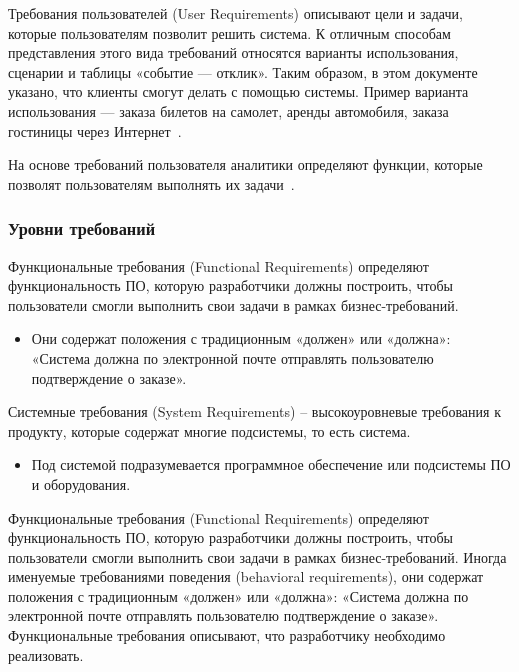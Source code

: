 \documentclass{../industrial-development}
\begin{document}
\alert{Требования пользователей (User Requirements)} описывают цели и задачи, которые пользователям позволит решить система. К отличным способам представления этого вида требований относятся варианты использования, сценарии и таблицы «событие — отклик». Таким образом, в этом документе указано, что клиенты смогут делать с помощью системы. Пример варианта использования — заказа билетов на самолет, аренды автомобиля, заказа гостиницы через Интернет~\cite[с.~8--9]{Wiegers}.

На основе требований пользователя аналитики определяют функции, которые позволят пользователям выполнять их задачи~\cite[с.~11]{Wiegers}.

\begin{frame} \frametitle{Уровни требований}
  \begin{block}{}
\alert{Функциональные требования (Functional Requirements)}	определяют функциональность ПО, которую разработчики должны построить, чтобы пользователи смогли выполнить свои задачи в рамках бизнес-требований.
  \end{block}
 		\begin{itemize}
\item Они содержат положения с традиционным «должен» или «должна»: «Система должна по электронной почте отправлять пользователю подтверждение о заказе».
		\end{itemize}
\begin{block}{}
\alert{Системные требования (System Requirements)} -- высокоуровневые требования к продукту, которые содержат многие подсистемы, то есть система.
  \end{block}
 		\begin{itemize}
\item Под системой подразумевается программное обеспечение или подсистемы ПО и оборудования.
		\end{itemize}
\end{frame}

\lecturenotes

\alert{Функциональные требования (Functional Requirements)} определяют функциональность ПО, которую разработчики должны построить, чтобы пользователи смогли выполнить свои задачи в рамках бизнес-требований. Иногда именуемые требованиями поведения (behavioral requirements), они содержат положения с традиционным «должен» или «должна»: «Система должна по электронной почте отправлять пользователю подтверждение о заказе». Функциональные требования описывают, что разработчику необходимо реализовать.
\end{document}
